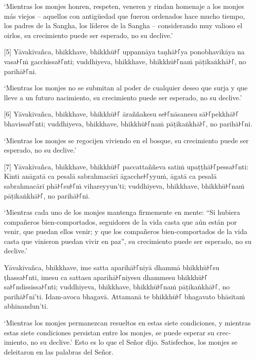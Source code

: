 \begin{english}
  `Mientras los monjes honren, respeten, veneren y rindan homenaje a los
  monjes más viejos -- aquellos con antigüedad que fueron ordenados hace mucho
  tiempo, los padres de la Sangha, los líderes de la Sangha -- considerando muy valioso
  el oirlos, su crecimiento puede ser
  esperado, no su declive.'
\end{english}

\enlargethispage{2\baselineskip}

[5] Yāvakīvañca, bhikkhave, bhikkhū꜔꜒ uppannāya taṇhā꜔꜒ya ponobhavikāya na vasa꜔꜒ṁ
gacchissa꜔꜒nti; vuddhiyeva, bhikkhave, bhikkhū꜔꜒naṁ pāṭikaṅkhā꜔꜒, no parihā꜔꜒ni.

\begin{english}
  `Mientras los monjes no se submitan al poder de cualquier deseo que surja y
  que lleve a un futuro nacimiento, su crecimiento puede ser
  esperado, no su declive.'
\end{english}

[6] Yāvakīvañca, bhikkhave, bhikkhū꜔꜒ āraññakesu se꜔꜒nāsanesu sā꜔꜒pekkhā꜔꜒ bhavissa꜔꜒nti;
vuddhiyeva, bhikkhave, bhikkhū꜔꜒naṁ pāṭikaṅkhā꜔꜒, no parihā꜔꜒ni.

\begin{english}
  `Mientras los monjes se regocijen viviendo en el bosque,
  su crecimiento puede ser esperado, no su declive.'
\end{english}

[7] Yāvakīvañca, bhikkhave, bhikkhū꜔꜒ paccattaññeva satiṁ upaṭṭhā꜔꜒pessa꜔꜒nti: Kinti
anāgatā ca pesalā sabrahmacārī āgacche꜔꜒yyuṁ, āgatā ca pesalā sabrahmacārī phā꜔꜒su꜔꜒ṁ
vihareyyun'ti; vuddhiyeva, bhikkhave, bhikkhū꜔꜒naṁ pāṭikaṅkhā꜔꜒, no parihā꜔꜒ni.

\begin{english}
  `Mientras cada uno de los monjes mantenga firmemente en mente: ``Si hubiera
  compañeros bien-comportados, seguidores de la vida casta que aún están por
  venir, que puedan ellos venir; y que los compañeros bien-comportados de la vida casta
  que vinieron puedan vivir en paz'', su crecimiento puede ser esperado, no su declive.'
\end{english}

Yāvakīvañca, bhikkhave, ime satta aparihā꜔꜒niyā dhammā bhikkhū꜔꜒su ṭhassa꜔꜒nti, imesu
ca sattasu aparihā꜔꜒niyesu dhammesu bhikkhū꜔꜒ sa꜔꜒ndississa꜔꜒nti; vuddhiyeva, bhikkhave,
bhikkhū꜔꜒naṁ pāṭikaṅkhā꜔꜒, no parihā꜔꜒nī'ti. Idam-avoca bhagavā. Attamanā te bhikkhū꜔꜒
bhagavato bhāsitaṁ abhinandun'ti.

\begin{english}
  `Mientras los monjes permanezcan resueltos en estas siete condiciones, y mientras
  estas siete condiciones persistan entre los monjes, se puede esperar su
  crecimiento, no su declive.' Esto es lo que el Señor dijo. Satisfechos,
  los monjes se deleitaron en las palabras del Señor.
\end{english}
